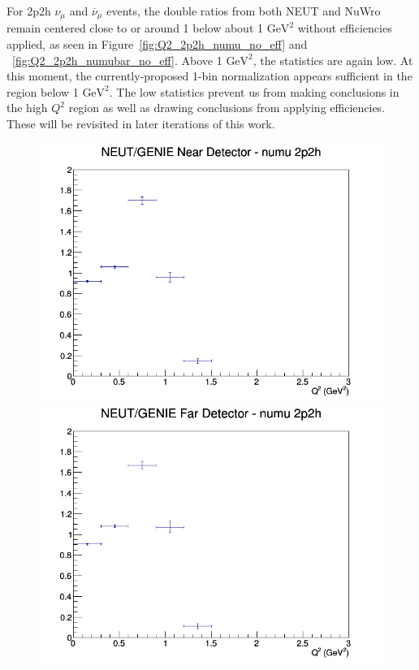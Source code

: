 \documentclass[12pt]{article}
\begin{document}
For 2p2h $\nu_{\mu}$ and $\overline{\nu}_{\mu}$ events, the double ratios from both NEUT and NuWro remain centered close to or around 1 below about 1 $\textrm{GeV}^2$ without efficiencies applied, as seen in Figure~\ref{fig:Q2_2p2h_numu_no_eff} and ~\ref{fig:Q2_2p2h_numubar_no_eff}. Above 1 $\textrm{GeV}^2$, the statistics are again low. At this moment, the currently-proposed 1-bin normalization appears sufficient in the region below 1 $\textrm{GeV}^2$. The low statistics prevent us from making conclusions in the high $Q^2$ region as well as drawing conclusions from applying efficiencies. These will be revisited in later iterations of this work.
\begin{figure}[h]
\includegraphics[width=\linewidth]{Q2/nominal/ratios/2p2h_NEUT_GENIE_numu_near_Q2.png}
\endminipage
{}
\includegraphics[width=\linewidth]{Q2/nominal/ratios/2p2h_NEUT_GENIE_numu_far_Q2.png}

\end{figure}
\end{document}
